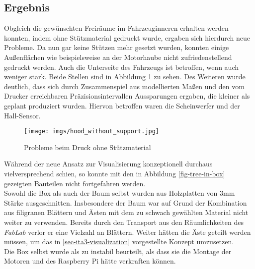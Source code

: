 \documentclass[.../Dokumentation.tex]{subfiles}
\begin{document}
\subsection{Ergebnis}\label{sec-ita3-result}
Obgleich die gewünschten Freiräume im Fahrzeuginneren erhalten werden konnten, 
indem ohne Stützmaterial gedruckt wurde, ergaben sich hierdurch neue Probleme.
Da nun gar keine Stützen mehr gesetzt wurden, konnten einige Außenflächen wie 
beispielsweise an der Motorhaube nicht zufriedenstellend gedruckt werden.
Auch die Unterseite des Fahrzeugs ist betroffen, wenn auch weniger stark.
Beide Stellen sind in Abbildung \ref{fig-hood-no-support} zu sehen.
Des Weiteren wurde deutlich, dass sich durch Zusammenspiel aus modellierten 
Maßen und den vom Drucker erreichbaren Präzisionsintervallen Aussparungen 
ergaben, die kleiner als geplant produziert wurden.
Hiervon betroffen waren die Scheinwerfer und der Hall-Sensor.
\begin{figure}[H]
\begin{center}
    \texttt{[image: imgs/hood\_without\_support.jpg]}
    \caption{Probleme beim Druck ohne Stützmaterial}
    \label{fig-hood-no-support}
\end{center}
\end{figure}
\noindent
Während der neue Ansatz zur Visualisierung konzeptionell durchaus 
vielversprechend schien, so konnte mit den in Abbildung \ref{fig-tree-in-box} 
gezeigten Bauteilen nicht fortgefahren werden. \\
Sowohl die Box als auch der Baum selbst wurden aus Holzplatten von 3mm 
Stärke ausgeschnitten. Insbesondere der Baum war auf Grund der Kombination 
aus filigranen Blättern und Ästen mit dem zu schwach gewählten Material nicht 
weiter zu verwenden. Bereits durch den Transport aus den Räumlichkeiten 
des \textit{FabLab} verlor er eine Vielzahl an Blättern. Weiter hätten die Äste 
geteilt werden müssen, um das in \ref{sec-ita3-visualization} vorgestellte 
Konzept umzusetzen.\\
Die Box selbst wurde als zu instabil beurteilt, als dass sie die Montage 
der Motoren und des Raspberry Pi hätte verkraften können.
\end{document}
